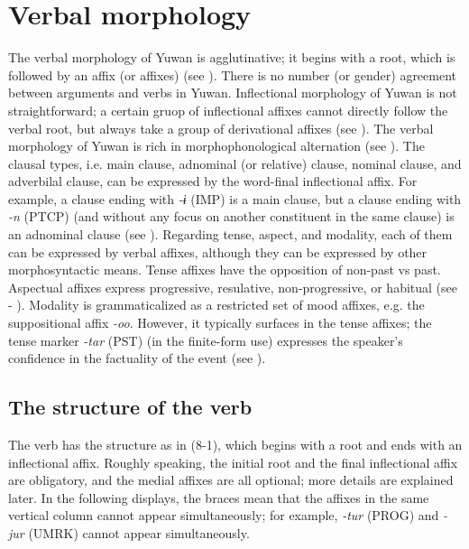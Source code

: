 \chapter{Verbal morphology}\label{chap:8}

The verbal morphology of Yuwan is agglutinative; it begins with a root, which is followed by an affix (or affixes) (see ). There is no number (or gender) agreement between arguments and verbs in Yuwan. Inflectional morphology of Yuwan is not straightforward; a certain gruop of inflectional affixes cannot directly follow the verbal root, but always take a group of derivational affixes (see ). The verbal morphology of Yuwan is rich in morphophonological alternation (see ). The clausal types, i.e. main clause, adnominal (or relative) clause, nominal clause, and adverbilal clause, can be expressed by the word-final inflectional affix. For example, a clause ending with \textit{{}-ɨ} (IMP) is a main clause, but a clause ending with \textit{-n} (PTCP) (and without any focus on another constituent in the same clause) is an adnominal clause (see ). Regarding tense, aspect, and modality, each of them can be expressed by verbal affixes, although they can be expressed by other morphosyntactic means. Tense affixes have the opposition of non-past vs past. Aspectual affixes express progressive, resulative, non-progressive, or habitual (see  - ). Modality is grammaticalized as a restricted set of mood affixes, e.g. the suppositional affix \textit{{}-oo}. However, it typically surfaces in the tense affixes; the tense marker \textit{-tar} (PST) (in the finite-form use) expresses the speaker’s confidence in the factuality of the event (see ).

\section{The structure of the verb}
\label{bkm:Ref303739828}
The verb has the structure as in (8-1), which begins with a root and ends with an inflectional affix. Roughly speaking, the initial root and the final inflectional affix are obligatory, and the medial affixes are all optional; more details are explained later. In the following displays, the braces mean that the affixes in the same vertical column cannot appear simultaneously; for example, \textit{{}-tur} (PROG) and \textit{{}-jur} (UMRK) cannot appear simultaneously.

